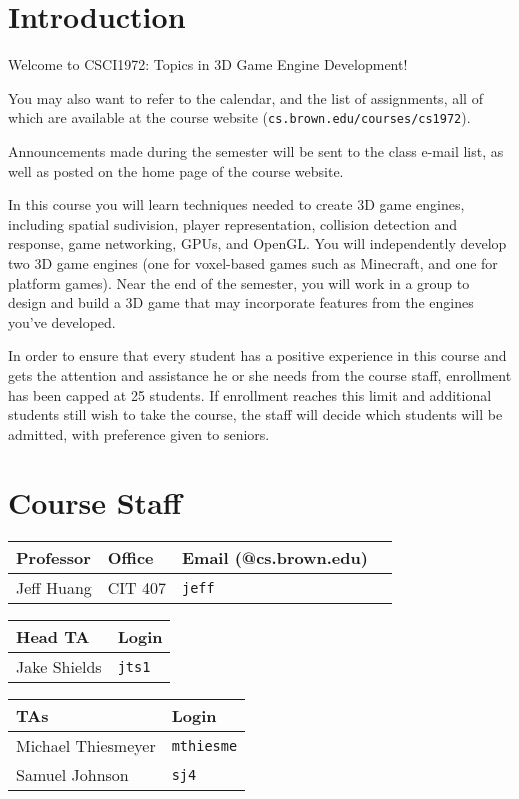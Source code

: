 \documentclass{cs1972}
\begin{document}
 \section*{Introduction}
 Welcome to CSCI1972: Topics in 3D Game Engine Development!
 
 You may also want to refer to the calendar, and the list of assignments, all of which are available at the course website (\texttt{cs.brown.edu/courses/cs1972}).
 
 Announcements made during the semester will be sent to the class e-mail list, as well as posted on the home page of the course website.
 
 In this course you will learn techniques needed to create 3D game engines, including spatial sudivision, player representation, collision detection and response, game networking, GPUs, and OpenGL.
 You will independently develop two 3D game engines (one for voxel-based games such as Minecraft,
 and one for platform games). Near the end of the semester, you will work in a group to design and
 build a 3D game that may incorporate features from the engines you've developed.
 
 In order to ensure that every student has a positive experience in this course and gets the attention and assistance he or she needs from the course staff, enrollment has been capped at 25 students. If enrollment reaches this limit and additional students still wish to take the course, the staff will decide which students will be admitted, with preference given to seniors.
 
 \section*{Course Staff}
 
 \begin{tabular}{l l l l}
  \textbf{Professor} & Office & Email (@cs.brown.edu) \\
  \hline
  Jeff Huang & CIT 407 & \texttt{jeff}
 \end{tabular}
 \smallskip 
 
 \begin{tabular}{l l}
  \textbf{Head TA} & Login \\
  \hline
  Jake Shields & \texttt{jts1}
 \end{tabular}
 \smallskip
 
 \begin{tabular}{l l}
  \textbf{TAs} & Login \\
  \hline
  Michael Thiesmeyer & \texttt{mthiesme} \\
  Samuel Johnson & \texttt{sj4}
 \end{tabular}
 
\end{document}
